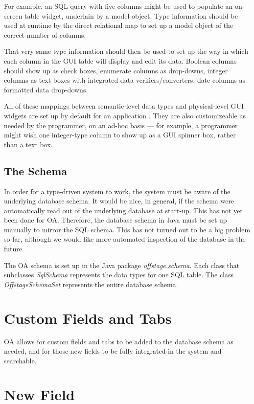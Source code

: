 \documentclass[11pt]{article}
\begin{document}
For example, an SQL query with five columns might be used to populate an on-screen table widget, underlain by a model object.  Type information should be used at runtime by the direct relational map to set up a model object of the correct number of columns.

That very same type information should then be used to set up the way in which each column in the GUI table will display and edit its data.  Boolean columns should show up as check boxes, enumerate columns as drop-downs, integer columns as text boxes with integrated data verifiers/converters, date columns as formatted data drop-downs.

All of these mappings between semantic-level data types and physical-level GUI widgets are set up by default for an application .  They are also customizeable as needed by the programmer, on an ad-hoc basis --- for example, a programmer might wish one integer-type column to show up as a GUI spinner box, rather than a text box.

\subsection{The Schema}

In order for a type-driven system to work, the system must be aware of the underlying database schema.  It would be nice, in general, if the schema were automatically read out of the underlying database at start-up.  This has not yet been done for OA.  Therefore, the database schema in Java must be set up manually to mirror the SQL schema.  This has not turned out to be a big problem so far, although we would like more automated inspection of the database in the future.

The OA schema is set up in the Java package \emph{offstage.schema}.  Each class that subclasses \emph{SqlSchema} represents the data types for one SQL table.  The class \emph{OffstageSchemaSet} represents the entire database schema.

\section{Custom Fields and Tabs}

OA allows for custom fields and tabs to be added to the database schema as needed, and for those new fields to be fully integrated in the system and searchable.

\section{New Field}
\end{document}
